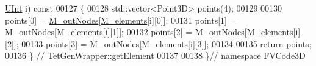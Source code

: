 \begin{DoxyCode}
      \hyperlink{namespaceFVCode3D_a4bf7e328c75d0fd504050d040ebe9eda}{UInt} i)\textcolor{keyword}{ const}
00127 \textcolor{keyword}{}\{
00128     std::vector<Point3D> points(4);
00129 
00130     points[0] = \hyperlink{classFVCode3D_1_1TetGenWrapper_a04672b7a2b60730190e0e82af43ed38b}{M\_outNodes}[\hyperlink{classFVCode3D_1_1TetGenWrapper_a016da330a68cb7cd44881dc26efed5b5}{M\_elements}[i][0]];
00131     points[1] = \hyperlink{classFVCode3D_1_1TetGenWrapper_a04672b7a2b60730190e0e82af43ed38b}{M\_outNodes}[M\_elements[i][1]];
00132     points[2] = \hyperlink{classFVCode3D_1_1TetGenWrapper_a04672b7a2b60730190e0e82af43ed38b}{M\_outNodes}[M\_elements[i][2]];
00133     points[3] = \hyperlink{classFVCode3D_1_1TetGenWrapper_a04672b7a2b60730190e0e82af43ed38b}{M\_outNodes}[M\_elements[i][3]];
00134 
00135     \textcolor{keywordflow}{return} points;
00136 \} \textcolor{comment}{// TetGenWrapper::getElement}
00137 
00138 \}\textcolor{comment}{// namespace FVCode3D}
\end{DoxyCode}
